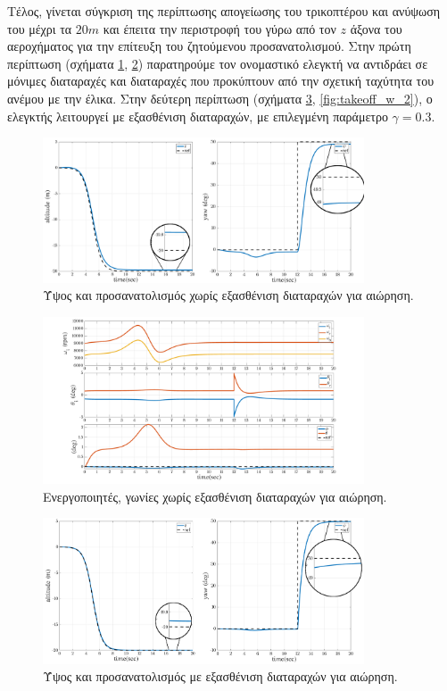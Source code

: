 Τέλος, γίνεται σύγκριση της περίπτωσης απογείωσης του τρικοπτέρου και ανύψωση 
του μέχρι τα $20 m$ και έπειτα την περιστροφή του γύρω από τον $z$ άξονα του 
αεροχήματος για την επίτευξη του ζητούμενου προσανατολισμού. Στην πρώτη 
περίπτωση (σχήματα \ref{fig:takeoff_wo_1}, \ref{fig:takeoff_wo_2}) παρατηρούμε 
τον ονομαστικό ελεγκτή να αντιδράει σε μόνιμες διαταραχές και διαταραχές που 
προκύπτουν από την σχετική ταχύτητα του ανέμου με την έλικα. Στην δεύτερη 
περίπτωση (σχήματα \ref{fig:takeoff_w_1}, \ref{fig:takeoff_w_2}), ο ελεγκτής 
λειτουργεί με εξασθένιση διαταραχών, με επιλεγμένη παράμετρο $\gamma = 0.3$.
\begin{figure}[H]
    \centering
    \includegraphics[width=0.85\textwidth]{Results/sigmoid_wo_1.png}
    \caption{Ύψος και προσανατολισμός χωρίς εξασθένιση διαταραχών για αιώρηση.}
    \label{fig:takeoff_wo_1}
\end{figure}
\begin{figure}[H]
    \centering
    \includegraphics[width=0.85\textwidth]{Results/sigmoid_wo_2.png}
    \caption{Ενεργοποιητές, γωνίες  χωρίς εξασθένιση διαταραχών για 
    αιώρηση.}
    \label{fig:takeoff_wo_2}
\end{figure}
\begin{figure}[H]
    \centering
    \includegraphics[width=0.85\textwidth]{Results/sigmoid_w_1.png}
    \caption{Ύψος και προσανατολισμός με εξασθένιση διαταραχών για αιώρηση.}
    \label{fig:takeoff_w_1}
\end{figure}
